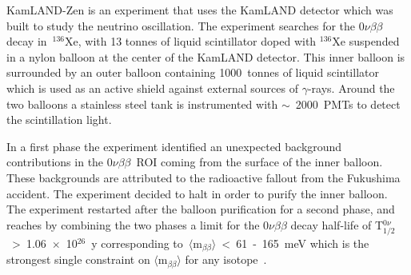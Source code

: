 \documentclass[main.tex]{subfiles}
\begin{document}
\NI KamLAND-Zen is an experiment that uses the KamLAND detector which was built to study the neutrino oscillation. The experiment searches for the 0$\nu\beta\beta$ decay in~$^{\text{136}}$Xe, with 13 tonnes of liquid scintillator doped with $^{\text{136}}$Xe suspended in a nylon balloon at the center of the KamLAND detector. This inner balloon is surrounded by an outer balloon containing 1000~tonnes of liquid scintillator which is used as an active shield against external sources of $\gamma$-rays. Around the two balloons a stainless steel tank is instrumented with $\sim$~2000~PMTs to detect the scintillation light.


\bigskip


\NI In a first phase the experiment identified an unexpected background contributions in the 0$\nu\beta\beta$~ROI coming from the surface of the inner balloon. These backgrounds are attributed to the radioactive fallout from the Fukushima accident. The experiment decided to halt in order to purify the inner balloon. The experiment restarted after the balloon purification for a second phase, and reaches by combining the two phases a limit for the 0$\nu\beta\beta$ decay half-life of T$_{\text{1/2}}^{0\nu}$~>~1.06~$\times$~10$^{\text{26}}$~y corresponding to~$\langle \text{m}_{\beta\beta} \rangle$~<~61~-~165~meV which is the strongest single constraint on $\langle \text{m}_{\beta\beta} \rangle$ for any isotope~\cite{KamLAND-ZenRecent}.    




\end{document}
